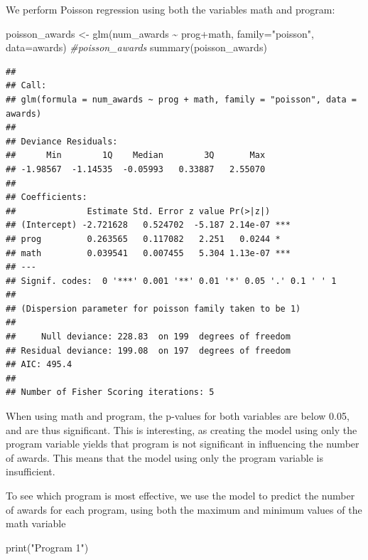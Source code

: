 \documentclass[
]{article}
\newenvironment{Shaded}{\begin{snugshade}}{\end{snugshade}}
\newcommand{\AttributeTok}[1]{\textcolor[rgb]{0.77,0.63,0.00}{#1}}
\newcommand{\CommentTok}[1]{\textcolor[rgb]{0.56,0.35,0.01}{\textit{#1}}}
\newcommand{\FunctionTok}[1]{\textcolor[rgb]{0.00,0.00,0.00}{#1}}
\newcommand{\NormalTok}[1]{#1}
\newcommand{\OtherTok}[1]{\textcolor[rgb]{0.56,0.35,0.01}{#1}}
\newcommand{\SpecialCharTok}[1]{\textcolor[rgb]{0.00,0.00,0.00}{#1}}
\newcommand{\StringTok}[1]{\textcolor[rgb]{0.31,0.60,0.02}{#1}}
\begin{document}
We perform Poisson regression using both the variables math and program:

\begin{Shaded}
\begin{Highlighting}[]
\NormalTok{poisson\_awards }\OtherTok{\textless{}{-}} \FunctionTok{glm}\NormalTok{(num\_awards }\SpecialCharTok{\textasciitilde{}}\NormalTok{ prog}\SpecialCharTok{+}\NormalTok{math, }\AttributeTok{family=}\StringTok{"poisson"}\NormalTok{, }\AttributeTok{data=}\NormalTok{awards)}
\CommentTok{\#poisson\_awards}
\FunctionTok{summary}\NormalTok{(poisson\_awards)}
\end{Highlighting}
\end{Shaded}

\begin{verbatim}
## 
## Call:
## glm(formula = num_awards ~ prog + math, family = "poisson", data = awards)
## 
## Deviance Residuals: 
##      Min        1Q    Median        3Q       Max  
## -1.98567  -1.14535  -0.05993   0.33887   2.55070  
## 
## Coefficients:
##              Estimate Std. Error z value Pr(>|z|)    
## (Intercept) -2.721628   0.524702  -5.187 2.14e-07 ***
## prog         0.263565   0.117082   2.251   0.0244 *  
## math         0.039541   0.007455   5.304 1.13e-07 ***
## ---
## Signif. codes:  0 '***' 0.001 '**' 0.01 '*' 0.05 '.' 0.1 ' ' 1
## 
## (Dispersion parameter for poisson family taken to be 1)
## 
##     Null deviance: 228.83  on 199  degrees of freedom
## Residual deviance: 199.08  on 197  degrees of freedom
## AIC: 495.4
## 
## Number of Fisher Scoring iterations: 5
\end{verbatim}

When using math and program, the p-values for both variables are below
0.05, and are thus significant. This is interesting, as creating the
model using only the program variable yields that program is not
significant in influencing the number of awards. This means that the
model using only the program variable is insufficient.

To see which program is most effective, we use the model to predict the
number of awards for each program, using both the maximum and minimum
values of the math variable

\begin{Shaded}
\begin{Highlighting}[]
\FunctionTok{print}\NormalTok{(}\StringTok{"Program 1"}\NormalTok{)}
\end{Highlighting}
\end{Shaded}
\end{document}
